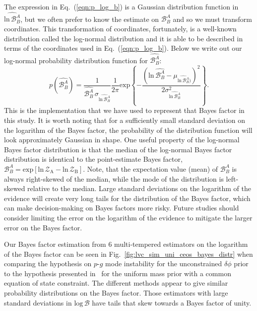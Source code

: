 The expression in Eq.~(\ref{eqn:p_log_b}) is a Gaussian distribution function in $\widehat{\mathrm{ln} \, \mathcal{B}^A_B}$, but we often prefer to know the estimate on $\mathcal{B}^A_B$ and so we must transform coordinates. This transformation of coordinates, fortunately, is a well-known distribution called the log-normal distribution and it is able to be described in terms of the coordinates used in Eq.~(\ref{eqn:p_log_b}). Below we write out our log-normal probability distribution function for $\widehat{\mathcal{B}^A_B}$:
\begin{equation}
    p(\widehat{\mathcal{B}^A_B}) = \frac{1}{\widehat{\mathcal{B}^A_B} \, \sigma_{\widehat{\mathrm{ln} \, \mathcal{B}^A_B}}} \frac{1}{2\pi} \mathrm{exp} \left \{-\frac{\left(\mathrm{ln} \, \widehat{\mathcal{B}^A_B} - \mu_{\widehat{\mathrm{ln} \, \mathcal{B}^A_B})}\right)^2} {2 \sigma^2_{\widehat{\mathrm{ln} \, \mathcal{B}^A_B}}}  \right\}.
\end{equation}
This is the implementation that we have used to represent that Bayes factor in this study. It is worth noting that for a sufficiently small standard deviation on the logarithm of the Bayes factor, the probability of the distribution function will look approximately Gaussian in shape. One useful property of the log-normal Bayes factor distribution is that the median of the log-normal Bayes factor distribution is identical to the point-estimate Bayes factor, $\mathcal{B}^A_B = \mathrm{exp} \left[\mathrm{ln} \, \mathcal{Z}_{\mathrm{A}} - \mathrm{ln} \, \mathcal{Z}_{\mathrm{B}} \right]$. Note, that the expectation value (mean) of $\mathcal{B}^A_B$ is always right-skewed of the median, while the mode of the distribution is left-skewed relative to the median. Large standard deviations on the logarithm of the evidence will create very long tails for the distribution of the Bayes factor, which can make decision-making on Bayes factors more risky. Future studies should consider limiting the error on the logarithm of the evidence to mitigate the larger error on the Bayes factor.

Our Bayes factor estimation from $6$ multi-tempered estimators on the logarithm of the Bayes factor can be seen in Fig.~\ref{fig:lvc_sim_uni_ceos_bayes_distr} when comparing the hypothesis on $p$-$g$ mode instability for the unconstrained $\delta \phi$ prior to the hypothesis presented in~\cite{de2018tidal} for the uniform mass prior with a common equation of state constraint. The different methods appear to give similar probability distributions on the Bayes factor. Those estimators with large standard deviations in $\mathrm{log} \, \mathcal{B}$ have tails that skew towards a Bayes factor of unity.


